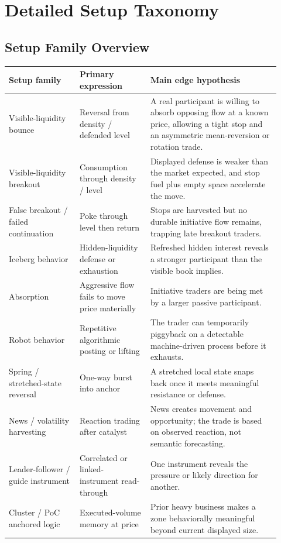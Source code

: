 \section{Detailed Setup Taxonomy}

\subsection{Setup Family Overview}

\begin{longtable}{p{0.24\linewidth}p{0.24\linewidth}p{0.44\linewidth}}
\toprule
\textbf{Setup family} & \textbf{Primary expression} & \textbf{Main edge hypothesis} \\
\midrule
Visible-liquidity bounce & Reversal from density / defended level & A real participant is willing to absorb opposing flow at a known price, allowing a tight stop and an asymmetric mean-reversion or rotation trade. \\
Visible-liquidity breakout & Consumption through density / level & Displayed defense is weaker than the market expected, and stop fuel plus empty space accelerate the move. \\
False breakout / failed continuation & Poke through level then return & Stops are harvested but no durable initiative flow remains, trapping late breakout traders. \\
Iceberg behavior & Hidden-liquidity defense or exhaustion & Refreshed hidden interest reveals a stronger participant than the visible book implies. \\
Absorption & Aggressive flow fails to move price materially & Initiative traders are being met by a larger passive participant. \\
Robot behavior & Repetitive algorithmic posting or lifting & The trader can temporarily piggyback on a detectable machine-driven process before it exhausts. \\
Spring / stretched-state reversal & One-way burst into anchor & A stretched local state snaps back once it meets meaningful resistance or defense. \\
News / volatility harvesting & Reaction trading after catalyst & News creates movement and opportunity; the trade is based on observed reaction, not semantic forecasting. \\
Leader-follower / guide instrument & Correlated or linked-instrument read-through & One instrument reveals the pressure or likely direction for another. \\
Cluster / PoC anchored logic & Executed-volume memory at price & Prior heavy business makes a zone behaviorally meaningful beyond current displayed size. \\
\bottomrule
\end{longtable}

